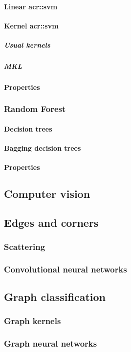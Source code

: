            \paragraph{Linear \acrshort*{acr::svm}}
            \paragraph{Kernel \acrshort*{acr::svm}}
                \subparagraph{Usual kernels}
                \subparagraph{MKL}
            \paragraph{Properties}
        \subsubsection{Random Forest}
            \paragraph{Decision trees}
            \paragraph{Bagging decision trees}
            \paragraph{Properties}
    \subsection{Computer vision}
        \subsection{Edges and corners}
        \subsubsection{Scattering}
        \subsubsection{Convolutional neural networks}
    \subsection{Graph classification}
        \subsubsection{Graph kernels}
        \subsubsection{Graph neural networks}
